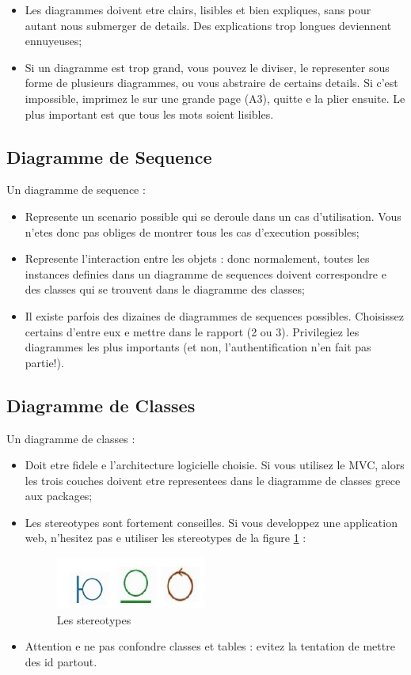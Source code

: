 \begin{spacing}{1.2}
\begin{itemize}
\item Les diagrammes doivent etre clairs, lisibles et bien expliques, sans pour autant
nous submerger de details. Des explications trop longues deviennent ennuyeuses;
\item Si un diagramme est trop grand, vous pouvez le diviser, le representer sous
forme de plusieurs diagrammes, ou vous abstraire de certains details. Si c'est
impossible, imprimez le sur une grande page (A3), quitte e la plier ensuite. Le
plus important est que tous les mots soient lisibles.

\end{itemize}
\subsection{Diagramme de Sequence}
Un diagramme de sequence :
\begin{itemize}
	\item Represente un scenario possible qui se deroule dans un cas d'utilisation. 
	Vous n'etes donc pas obliges de montrer tous les cas d'execution possibles;
	\item Represente l'interaction entre les objets : donc normalement, toutes les
	instances definies dans un diagramme de sequences doivent correspondre 
	 e des classes qui se trouvent dans le diagramme des classes;
	 \item Il existe parfois des dizaines de diagrammes de sequences possibles. Choisissez certains d'entre eux e mettre dans le rapport (2 ou 3). Privilegiez les diagrammes les plus importants (et non, l'authentification n'en fait pas partie!).
\end{itemize}
\subsection{Diagramme de Classes}
Un diagramme de classes :
\begin{itemize}
\item Doit etre fidele e l'architecture logicielle choisie. Si vous utilisez le MVC, 
alors les trois couches doivent etre representees dans le diagramme de classes grece aux packages;
\item Les stereotypes sont fortement conseilles. Si vous developpez une
application web, n'hesitez pas e utiliser les stereotypes de la figure \ref{fig:fig2} : 
\begin{figure}[!ht]\centering
\includegraphics[scale=0.9]{stereotypes.jpg}
\caption{Les stereotypes}
\label{fig:fig2}
\end{figure}
\item Attention e ne pas confondre classes et tables : evitez la tentation de
mettre des id partout.


\end{itemize}
\end{spacing}
